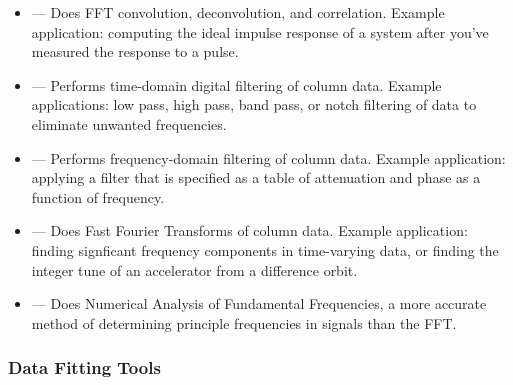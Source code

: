 \documentclass[11pt]{article}
\begin{document}
\begin{itemize}

\item {} --- Does FFT convolution, deconvolution, and correlation. Example
application: computing the ideal impulse response of a system after you've measured the response to
a pulse.

\item {} --- Performs time-domain digital filtering of column data.  Example applications:
low pass, high pass, band pass, or notch filtering of data to eliminate unwanted frequencies.

\item {} --- Performs frequency-domain filtering of column data.  Example application:
applying a filter that is specified as a table of attenuation and phase as a function of frequency.

\item {} --- Does Fast Fourier Transforms of column data.  Example application: finding signficant
frequency components in time-varying data, or finding the integer tune of an accelerator from a difference orbit.

\item {} --- Does Numerical Analysis of Fundamental Frequencies, a more accurate
method of determining principle frequencies in signals than the FFT.

\end{itemize}

\subsubsection{Data Fitting Tools}
\end{document}
